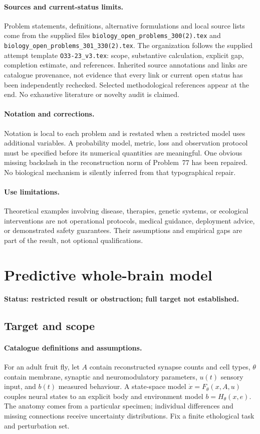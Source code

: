 \documentclass[11pt]{article}
\begin{document}
\paragraph{Sources and current-status limits.}
Problem statements, definitions, alternative formulations and local source lists
come from the supplied files
\texttt{biology\_open\_problems\_300(2).tex} and
\texttt{biology\_open\_problems\_301\_330(2).tex}.
The organization follows the supplied attempt template
\texttt{O33-23\_v3.tex}: scope, substantive calculation, explicit gap,
completion estimate, and references. Inherited source annotations and links are
catalogue provenance, not evidence that every link or current open status has
been independently rechecked. Selected methodological references appear at the
end. No exhaustive literature or novelty audit is claimed.

\paragraph{Notation and corrections.}
Notation is local to each problem and is restated when a restricted model uses
additional variables. A probability model, metric, loss and observation protocol
must be specified before its numerical quantities are meaningful. One obvious
missing backslash in the reconstruction norm of Problem~77 has been repaired.
No biological mechanism is silently inferred from that typographical repair.

\paragraph{Use limitations.}
Theoretical examples involving disease, therapies, genetic systems, or ecological
interventions are not operational protocols, medical guidance, deployment advice,
or demonstrated safety guarantees. Their assumptions and empirical gaps are part
of the result, not optional qualifications.


\section*{Predictive whole-brain model}
\label{prob:109}
\noindent\textbf{Status: restricted result or obstruction; full target not established.}
\subsection{Target and scope}
\paragraph{Catalogue definitions and assumptions.}
For an adult fruit fly, let $A$ contain reconstructed synapse counts and cell types, $\theta$ contain membrane, synaptic and neuromodulatory parameters, $u(t)$ sensory input, and $b(t)$ measured behaviour. A state-space model $\dot x=F_\theta(x,A,u)$ couples neural states to an explicit body and environment model $b=H_\theta(x,e)$. The anatomy comes from a particular specimen; individual differences and missing connections receive uncertainty distributions. Fix a finite ethological task and perturbation set.
\end{document}
